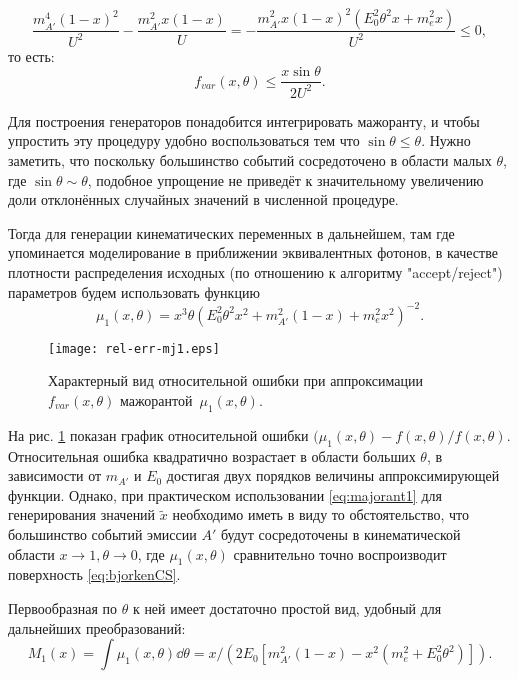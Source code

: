 \begin{equation}
    \frac{m_{A'}^4 (1-x)^2}{U^2} - \frac{m_{A'}^2 x (1-x)}{U} =
    - \frac{m_{A'}^2 x (1-x)^2 (E_0^2 \theta^2 x + m_e^2 x) }{U^2} \le 0,
\end{equation}
то есть:
\begin{equation}
    f_{var}(x, \theta) \le \frac{x \sin \theta}{2 U^2}.
\end{equation}

Для построения генераторов понадобится интегрировать мажоранту, и чтобы
упростить эту процедуру удобно воспользоваться тем что $\sin \theta \le \theta$.
Нужно заметить, что поскольку большинство событий сосредоточено в области
малых $\theta$, где
$\sin \theta \sim \theta$, подобное упрощение не приведёт к значительному
увеличению доли отклонённых случайных значений в численной процедуре.

Тогда для генерации
кинематических переменных в дальнейшем, там где упоминается моделирование в
приближении эквивалентных фотонов, в качестве плотности распределения исходных
(по отношению к алгоритму "accept/reject") параметров будем использовать функцию
\begin{equation}
    \mu_1(x, \theta) = x^3 \theta
        (E_0^2 \theta^2 x^2 + m_{A'}^2(1-x) + m_e^2 x^2)^{-2}.
\label{eq:majorant1}
\end{equation}

\begin{figure}
    \centering
    \texttt{[image: rel-err-mj1.eps]}
    \caption{ Характерный вид относительной ошибки при
    аппроксимации~$f_{var}(x, \theta)$ мажорантой~$\mu_1(x,\theta)$. }
    \label{fig:mj1RelError}
\end{figure}

На рис. \ref{fig:mj1RelError} показан график относительной
ошибки $(\mu_1(x,\theta) - f(x,\theta)/f(x,\theta)$.
Относительная ошибка квадратично возрастает в области больших $\theta$, в
зависимости от $m_{A'}$ и $E_0$ достигая двух порядков величины аппроксимирующей
функции. Однако, при практическом использовании \eqref{eq:majorant1}
для генерирования значений $\tilde{x}$ необходимо иметь в виду то
обстоятельство, что большинство событий эмиссии $A'$ будут
сосредоточены в кинематической области $x \rightarrow 1, \theta \rightarrow 0$,
где $\mu_1(x, \theta)$ сравнительно точно воспроизводит поверхность
\eqref{eq:bjorkenCS}.

Первообразная по $\theta$ к ней имеет достаточно простой вид, удобный для
дальнейших преобразований:
\begin{equation}
    M_1(x) = \int \mu_1(x, \theta) \dd{\theta} = x / (2 E_0 \left[m_{A'}^2 (1 - x) - x^2 (m_e^2 + E_0^2 \theta^2) \right]).
\end{equation}

